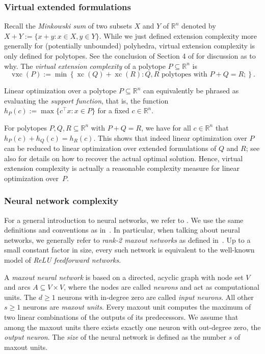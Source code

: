 \documentclass[centering,11pt,reqno]{amsart}
\theoremstyle{definition}
\newcommand{\R}{\mathbb{R}}
\DeclareMathOperator{\xc}{xc}
\DeclareMathOperator{\vxc}{vxc}
\def\R{\mathbb{R}}
\newcommand{\defn}[1]{\emph{#1}}
\begin{document}
\subsubsection{Virtual extended formulations} 
Recall the \defn{Minkowski sum} of two subsets $X$ and $Y$ of $\R^n$ denoted by $X+Y:=\{x+y:x\in X,y\in Y\}$.
While we just defined extension complexity more generally for (potentially unbounded) polyhedra, virtual extension complexity is only defined for polytopes. See the conclusion of Section 4 of \cite{VirtualExtensions} for discussion as to why. 
The \defn{virtual extension complexity} of a polytope $P\subseteq\R^n$ is 
\[\vxc(P):=\min\left\{\xc(Q)+\xc(R): Q, R \text{ polytopes with } P+Q=R; \right\}.\]


Linear optimization over a polytope $P\subseteq\R^n$ can equivalently be phrased as evaluating the \defn{support function}, that is, the function $h_P(c):=\max\{c^{\top}x:x\in P\}$ for a fixed $c \in \R^n$.

For polytopes $P,Q,R\subseteq\R^n$ with $P+Q=R$, we have for all $c\in\R^n$ that $h_P(c)+h_Q(c)=h_R(c)$.
This shows that indeed linear optimization over $P$ can be reduced to linear optimization over extended formulations of $Q$ and $R$; see also \cite{VirtualExtensions} for details on how to recover the actual optimal solution. 
Hence, virtual extension complexity is actually a reasonable complexity measure for linear optimization over~$P$.


\subsubsection{Neural network complexity}
\label{subsec:nncomplexity}
For a general introduction to neural networks, we refer to \cite{Goodfellow-et-al-2016}. We use the same definitions and conventions as in~\cite{VirtualExtensions}.
In particular, when talking about neural networks, we generally refer to \emph{rank-2 maxout networks} as defined in~\cite{VirtualExtensions}. Up to a small constant factor in size, every such network is equivalent to the well-known model of \emph{ReLU feedforward networks}.

A \defn{maxout neural network} is based on a directed, acyclic graph with node set $V$ and arcs $A \subseteq V \times V$, where the nodes are called \defn{neurons} and act as computational units.
The $d\geq1$ neurons with in-degree zero are called \defn{input neurons}. All other $s\geq1$ neurons are \defn{maxout units}. Every maxout unit computes the maximum of two linear combinations of the outputs of its predecessors.
We assume that among the maxout units there exists exactly one neuron with out-degree zero, the \defn{output neuron}.
The \defn{size} of the neural network is defined as the number $s$ of maxout units. 
\end{document}
